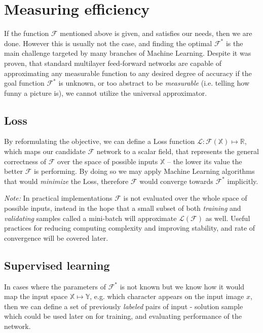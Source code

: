\section{Measuring efficiency}
If the function $\mathcal{F}$ mentioned above is given, and satisfies our needs, then we are done.
However this is usually not the case, and finding the optimal $\mathcal{F}^*$ is the main challenge targeted by many branches of Machine Learning.
Despite it was proven, that standard multilayer
feed-forward networks are capable of approximating
any measurable function to any desired degree of
accuracy \cite{hornik1989multilayer}
if the goal function $\mathcal{F}^*$ is unknown, 
or too abstract to be \emph{measurable} (i.e. telling how funny a picture is), 
we cannot utilize the universal approximator.

\subsection{Loss} 
By reformulating the objective, we can define a Loss function $\mathcal{L}:\mathcal{F}(\mathbb{X}) \mapsto \mathbb{R}$,
which maps our candidate $\mathcal{F}$ network to a scalar field, that represents the general correctness of $\mathcal{F}$ over the space of possible inputs $\mathbb{X}$ -- the lower its value the better $\mathcal{F}$ is performing.
By doing so we may apply Machine Learning algorithms that would \emph{minimize} the Loss, therefore $\mathcal{F}$ would converge towards $\mathcal{F}^*$ implicitly.

\emph{Note:} In practical implementations $\mathcal{F}$ is not evaluated over the whole space of possible inputs, instead in the hope that a small subset of both \emph{training} and \emph{validating} samples called a mini-batch will approximate $\mathcal{L}(\mathcal{F})$ as well. Useful practices for reducing computing complexity and improving stability, and rate of convergence will be covered later.


\subsection{Supervised learning}
In cases where the parameters of $\mathcal{F}^*$ is not known but we know how it would map the input space $\mathbb{X} \mapsto \mathbb{Y}$, e.g. which character appears on the input image $x$, then we can define a set of previously \emph{labeled} pairs of input - solution sample which could be used later on for training, and evaluating performance of the network.

